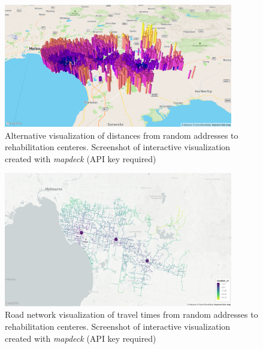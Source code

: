 \documentclass[utf8]{frontiersHLTH}
\begin{document}
\begin{figure}[h!]
\begin{center}
\includegraphics[width=10cm]{directions_all_rehab_mapdeck_hexagons.png}
\end{center}
\caption{Alternative visualization of distances from random addresses to rehabilitation centeres. Screenshot of interactive visualization created with {\em mapdeck} (API key required)}\label{fig:RehabCenterAddressDistanceHex}
\end{figure}

\begin{figure}[h!]
\begin{center}
\includegraphics[width=10cm]{duration_all_rehab.png}
\end{center}
\caption{Road network visualization of travel times from random addresses to rehabilitation centeres. Screenshot of interactive visualization created with {\em mapdeck} (API key required)}\label{fig:RehabCenterAddressDistance}
\end{figure}
\end{document}
